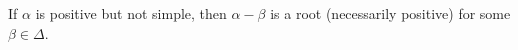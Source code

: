 If $\alpha$ is positive but not simple, then $\alpha - \beta$ is a root (necessarily positive) for some $\beta \in \Delta$.
